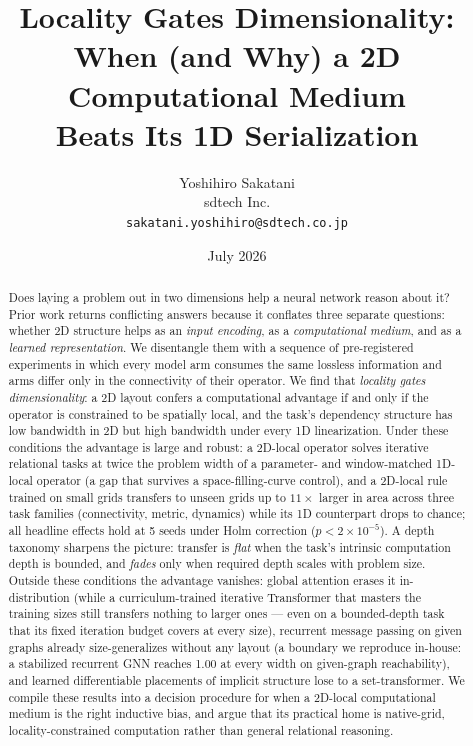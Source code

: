 \documentclass[11pt]{article}
\title{Locality Gates Dimensionality:\\ When (and Why) a 2D Computational Medium\\ Beats Its 1D Serialization}
\author{Yoshihiro Sakatani\\ \small sdtech Inc. \\ \small \texttt{sakatani.yoshihiro@sdtech.co.jp}}
\date{July 2026}
\begin{document}
\maketitle

\begin{abstract}
Does laying a problem out in two dimensions help a neural network reason about
it? Prior work returns conflicting answers because it conflates three separate
questions: whether 2D structure helps as an \emph{input encoding}, as a
\emph{computational medium}, and as a \emph{learned representation}. We
disentangle them with a sequence of pre-registered experiments in which every
model arm consumes the same lossless information and arms differ only in the
connectivity of their operator. We find that \emph{locality gates
dimensionality}: a 2D layout confers a computational advantage if and only if
the operator is constrained to be spatially local, and the task's dependency
structure has low bandwidth in 2D but high bandwidth under every 1D
linearization. Under these conditions the advantage is large and robust: a
2D-local operator solves iterative relational tasks at twice the problem width
of a parameter- and window-matched 1D-local operator (a gap that survives a
space-filling-curve control), and a 2D-local rule trained on small grids
transfers to unseen grids up to $11\times$ larger in area across three task
families (connectivity, metric, dynamics) while its 1D counterpart drops to
chance; all headline effects hold at 5 seeds under Holm correction
($p < 2\times10^{-5}$). A depth taxonomy sharpens the picture: transfer is
\emph{flat} when the task's intrinsic computation depth is bounded, and
\emph{fades} only when required depth scales with problem size. Outside these
conditions the advantage vanishes: global attention erases it in-distribution
(while a curriculum-trained iterative Transformer that masters the training
sizes still transfers nothing to larger ones --- even on a bounded-depth
task that its fixed iteration budget covers at every size), recurrent
message passing on
given graphs already size-generalizes without any layout (a boundary we
reproduce in-house: a stabilized recurrent GNN reaches 1.00 at every width on
given-graph reachability), and learned differentiable placements of implicit
structure lose to a set-transformer. We compile these results into a decision procedure for when a
2D-local computational medium is the right inductive bias, and argue that its
practical home is native-grid, locality-constrained computation rather than
general relational reasoning.
\end{abstract}
\end{document}
